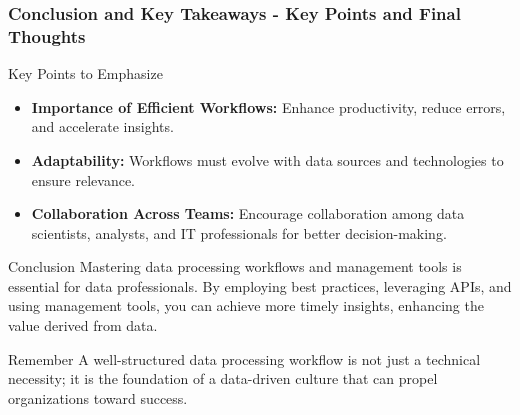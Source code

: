 \documentclass[aspectratio=169]{beamer}
\begin{document}
\begin{frame}[fragile]
    \frametitle{Conclusion and Key Takeaways - Key Points and Final Thoughts}
    \begin{block}{Key Points to Emphasize}
        \begin{itemize}
            \item \textbf{Importance of Efficient Workflows:} Enhance productivity, reduce errors, and accelerate insights.
            \item \textbf{Adaptability:} Workflows must evolve with data sources and technologies to ensure relevance.
            \item \textbf{Collaboration Across Teams:} Encourage collaboration among data scientists, analysts, and IT professionals for better decision-making.
        \end{itemize}
    \end{block}

    \begin{block}{Conclusion}
        Mastering data processing workflows and management tools is essential for data professionals. By employing best practices, leveraging APIs, and using management tools, you can achieve more timely insights, enhancing the value derived from data.
    \end{block}

    \begin{alertblock}{Remember}
        A well-structured data processing workflow is not just a technical necessity; it is the foundation of a data-driven culture that can propel organizations toward success.
    \end{alertblock}
\end{frame}
\end{document}
